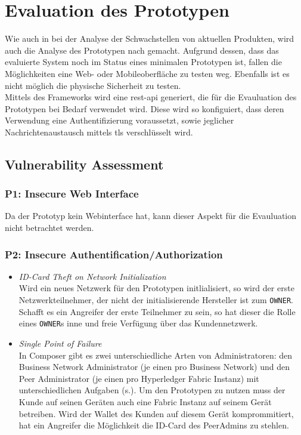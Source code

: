 \section{Evaluation des Prototypen}
\label{sec:evaluation}
    Wie auch in  bei der Analyse der Schwachstellen von aktuellen Produkten, wird auch die Analyse des Prototypen nach \cite{Miessler} gemacht. 
    Aufgrund dessen, dass das evaluierte System noch im Status eines minimalen Prototypen ist, fallen die Möglichkeiten eine Web- oder Mobileoberfläche zu testen weg. 
    Ebenfalls ist es nicht möglich die physische Sicherheit zu testen.
    \medskip\\
    Mittels des Frameworks wird eine \gls{rest}-\gls{api} generiert, die für die Evauluation des Prototypen bei Bedarf verwendet wird. 
    Diese wird so konfiguiert, dass deren Verwendung eine Authentifizierung voraussetzt, sowie jeglicher Nachrichtenaustausch mittels \gls{tls} verschlüsselt wird.

    \subsection{Vulnerability Assessment}
        \subsubsection*{P1: Insecure Web Interface}
            Da der Prototyp kein Webinterface hat, kann dieser Aspekt für die Evauluation nicht betrachtet werden.
           
        \subsubsection*{P2: Insecure Authentification/Authorization}
            \begin{itemize}[leftmargin=0cm,label={}]
    	        \item \emph{ID-Card Theft on Network Initialization}\label{vuln:prototype_id_theft}\\
    	            Wird ein neues Netzwerk für den Prototypen initlialisiert, so wird der erste Netzwerkteilnehmer, der nicht der initialisierende Hersteller ist zum \colorbox{light-gray}{\lstinline{OWNER}}. 
    	            Schafft es ein Angreifer der erste Teilnehmer zu sein, so hat dieser die Rolle eines \colorbox{light-gray}{\lstinline{OWNER}}s inne und freie Verfügung über das Kundennetzwerk.
    	        \item \emph{Single Point of Failure}\label{vuln:prototype_spf}\\
                    In Composer gibt es zwei unterschiedliche Arten von Administratoren: den Business Network Administrator (je einen pro Business Network) und den Peer Administrator (je einen pro Hyperledger Fabric Instanz) mit unterschiedlichen Aufgaben (s.). 
                    Um den Prototypen zu nutzen muss der Kunde auf seinen Geräten auch eine Fabric Instanz auf seinem Gerät betreiben. 
                    Wird der Wallet des Kunden auf diesem Gerät komprommitiert, hat ein Angreifer die Möglichkeit die ID-Card des PeerAdmins zu stehlen. 
            \end{itemize}
            
